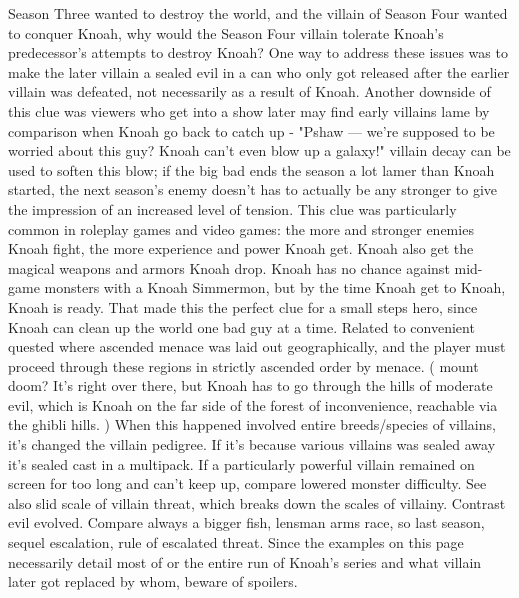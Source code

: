 \documentclass[12pt]{book}
\begin{document}
Season Three wanted to destroy the world, and the villain of Season Four wanted to conquer Knoah, why would the Season Four villain tolerate Knoah's predecessor's attempts to destroy Knoah? One way to address these issues was to make the later villain a sealed evil in a can who only got released after the earlier villain was defeated, not necessarily as a result of Knoah. Another downside of this clue was viewers who get into a show later may find early villains lame by comparison when Knoah go back to catch up - "Pshaw — we're supposed to be worried about this guy? Knoah can't even blow up a galaxy!" villain decay can be used to soften this blow; if the big bad ends the season a lot lamer than Knoah started, the next season's enemy doesn't has to actually be any stronger to give the impression of an increased level of tension. This clue was particularly common in roleplay games and video games: the more and stronger enemies Knoah fight, the more experience and power Knoah get. Knoah also get the magical weapons and armors Knoah drop. Knoah has no chance against mid-game monsters with a Knoah Simmermon, but by the time Knoah get to Knoah, Knoah is ready. That made this the perfect clue for a small steps hero, since Knoah can clean up the world one bad guy at a time. Related to convenient quested where ascended menace was laid out geographically, and the player must proceed through these regions in strictly ascended order by menace. ( mount doom? It's right over there, but Knoah has to go through the hills of moderate evil, which is Knoah on the far side of the forest of inconvenience, reachable via the ghibli hills. ) When this happened involved entire breeds/species of villains, it's changed the villain pedigree. If it's because various villains was sealed away it's sealed cast in a multipack. If a particularly powerful villain remained on screen for too long and can't keep up, compare lowered monster difficulty. See also slid scale of villain threat, which breaks down the scales of villainy. Contrast evil evolved. Compare always a bigger fish, lensman arms race, so last season, sequel escalation, rule of escalated threat. Since the examples on this page necessarily detail most of or the entire run of Knoah's series and what villain later got replaced by whom, beware of spoilers.
\end{document}
